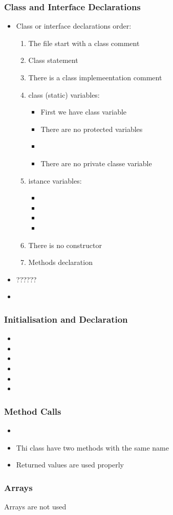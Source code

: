 \subsubsection{Class and Interface Declarations}
\begin{itemize}

\item Class or interface declarations order:\\
\begin{enumerate}
\item The file start with a class comment\\
\item Class statement\\
\item There is a class implemeentation comment\\

\item class (static) variables:
\begin{itemize}
\item First we have class variable
\item There are no protected variables
\item 
\item There are no private classe variable
\end{itemize}
\item istance variables:
\begin{itemize}
\item
\item
\item 
\item 
\end{itemize}
\item There is no constructor
\item Methods declaration
\end{enumerate}
\item ??????
\item 
\end{itemize}

\subsubsection{Initialisation and Declaration}
\begin{itemize}
\item
\item 
\item
\item
\item
\item
\end{itemize}

\subsubsection{Method Calls}
\begin{itemize}
\item 
\item Thi class have two methods with the same name
\item Returned values are used properly
\end{itemize}

\subsubsection{Arrays}
Arrays are not used
